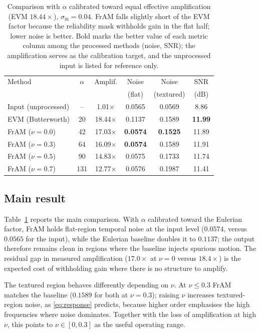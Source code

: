 \documentclass[conference]{IEEEtran}
\begin{document}
\begin{table}[t]
\caption{Comparison with $\alpha$ calibrated toward equal effective
amplification (EVM $18.44\times$), $\sigma_{\text{in}} = 0.04$.
FrAM falls slightly short of the EVM factor because the reliability mask
withholds gain in the flat half; lower noise is better. Bold marks the better
value of each metric column among the processed methods (noise, SNR); the
amplification serves as the calibration target, and the unprocessed input is
listed for reference only.}
\label{tab:main}
\centering
\begin{tabular}{lccccc}
\toprule
Method & $\alpha$ & Amplif. & Noise & Noise & SNR \\
       &          &         & (flat) & (textured) & (dB) \\
\midrule
Input (unprocessed)   & --  & 1.01$\times$  & 0.0565 & 0.0569 & 8.86 \\
EVM (Butterworth)     & 20  & 18.44$\times$ & 0.1137 & 0.1589 & \textbf{11.99} \\
\midrule
FrAM ($\nu = 0.0$)    & 42  & 17.03$\times$ & \textbf{0.0574} & \textbf{0.1525} & 11.89 \\
FrAM ($\nu = 0.3$)    & 64  & 16.09$\times$ & \textbf{0.0574} & 0.1589 & 11.91 \\
FrAM ($\nu = 0.5$)    & 90  & 14.83$\times$ & 0.0575 & 0.1733 & 11.74 \\
FrAM ($\nu = 0.7$)    & 131 & 12.77$\times$ & 0.0576 & 0.1987 & 11.41 \\
\bottomrule
\end{tabular}
\end{table}

\subsection{Main result}
Table~\ref{tab:main} reports the main comparison. With $\alpha$ calibrated
toward the Eulerian factor, FrAM holds flat-region temporal noise at the input
level ($0.0574$, versus $0.0565$ for the input), while the Eulerian baseline
doubles it to $0.1137$; the output therefore remains clean in regions where
the baseline injects spurious motion. The residual gap in measured
amplification ($17.0\times$ at $\nu=0$ versus $18.4\times$) is the expected
cost of withholding gain where there is no structure to amplify.

The textured region behaves differently depending on $\nu$. At
$\nu \leq 0.3$ FrAM matches the baseline ($0.1589$ for both at $\nu=0.3$);
raising $\nu$ increases textured-region noise, as \eqref{eq:response}
predicts, because higher order emphasises the high frequencies where noise
dominates. Together with the loss of amplification at high $\nu$, this points
to $\nu \in [0, 0.3]$ as the useful operating range.
\end{document}
